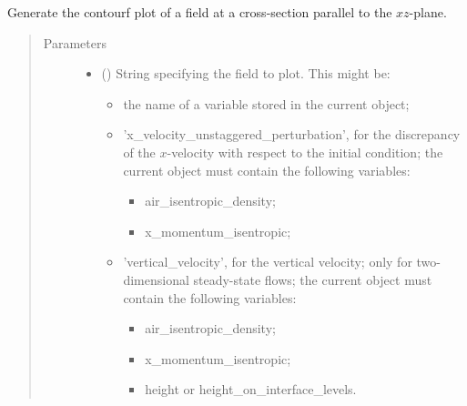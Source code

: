 \documentclass[letterpaper,10pt,english]{sphinxmanual}
\begin{document}
\begin{fulllineitems}
\begin{fulllineitems}
\begin{quote}
\begin{description}
\end{description}\end{quote}

\end{fulllineitems}


\begin{fulllineitems}
\label{\detokenize{api:tasmania.storages.state_isentropic.StateIsentropic.contourf_xz}}
Generate the contourf plot of a field at a cross-section parallel to the \(xz\)-plane.
\begin{quote}\begin{description}
\item[{Parameters}] \leavevmode\begin{itemize}
\item {} 
 () \textendash{} 
String specifying the field to plot. This might be:
\begin{itemize}
\item {} 
the name of a variable stored in the current object;

\item {} 
’x\_velocity\_unstaggered\_perturbation’, for the discrepancy of the \(x\)-velocity with respect to                          the initial condition; the current object must contain the following variables:
\begin{itemize}
\item {} 
air\_isentropic\_density;

\item {} 
x\_momentum\_isentropic;

\end{itemize}

\item {} 
’vertical\_velocity’, for the vertical velocity; only for two-dimensional steady-state flows;                          the current object must contain the following variables:
\begin{itemize}
\item {} 
air\_isentropic\_density;

\item {} 
x\_momentum\_isentropic;

\item {} 
height or height\_on\_interface\_levels.


\end{itemize}
\end{itemize}
\end{itemize}
\end{description}
\end{quote}
\end{fulllineitems}
\end{fulllineitems}
\end{document}
